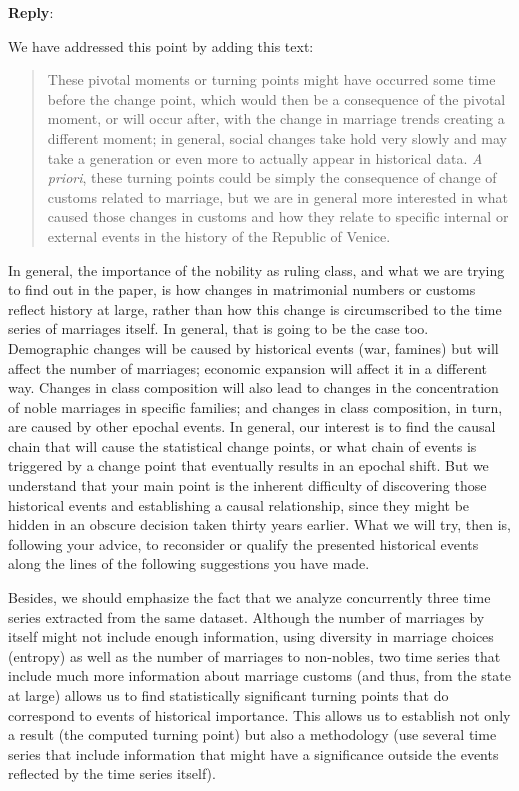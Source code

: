 \documentclass[11pt]{article}
\newcounter{reviewer}
\newcounter{point}[reviewer]
\newenvironment{reply}
   {\medskip \noindent \begin{sf}\textbf{Reply}:\  }
   {\medskip \end{sf}}
\begin{document}
\begin{reply}

  We have addressed this point by adding this text:
  \begin{quote}
    These pivotal moments or turning points might have occurred some time before the change point, which would then be a consequence of the pivotal moment, or will occur after, with the change in marriage trends creating a different moment; in general, social changes take hold very slowly and may take a generation or even more to actually appear in historical data. {\em A priori}, these turning points could be simply the consequence of change of customs related to marriage, but we are in general more interested in what caused those changes in customs and how they relate to specific internal or external events in the history of the Republic of Venice.
  \end{quote}

  In general, the importance of the nobility as ruling class, and what we are
  trying to find out in the paper, is how changes in matrimonial numbers or
  customs reflect history at large, rather than how this change is circumscribed
  to the time series of marriages itself. In general, that is going to be the
  case too. Demographic changes will be caused by historical events (war,
  famines) but will affect the number of marriages; economic expansion will
  affect it in a different way. Changes in class composition will also lead to
  changes in the concentration of noble marriages in specific families; and
  changes in class composition, in turn, are caused by other epochal events. In
  general, our interest is to find the causal chain that will cause the
  statistical change points, or what chain of events is triggered by a change
  point that eventually results in an epochal shift. But we understand that your
  main point is the inherent difficulty of discovering those historical events
  and establishing a causal relationship, since they might be hidden in an
  obscure decision taken thirty years earlier. What we will try, then is,
  following your advice, to reconsider or qualify the presented historical
  events along the lines of the following suggestions you have made.

  Besides, we should emphasize the fact that we analyze concurrently three time
  series extracted from the same dataset. Although the number of marriages by
  itself might not include enough information, using diversity in marriage
  choices (entropy) as well as the number of marriages to non-nobles, two time
  series that include much more information about marriage customs (and thus,
  from the state at large) allows us to find statistically significant turning
  points that do correspond to events of historical importance. This allows us
  to establish not only a result (the computed turning point) but also a
  methodology (use several time series that include information that might have
  a significance outside the events reflected by the time series itself).
\end{reply}
\end{document}
